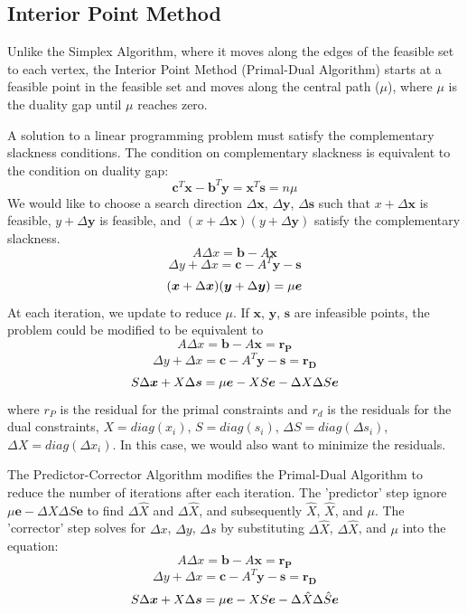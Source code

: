 \documentclass[journal, 11pt, a4paper, twoside]{IEEEtran}
\begin{document}
\subsection{Interior Point Method}
Unlike the Simplex Algorithm, where it moves along the edges of the feasible set to each vertex, the Interior Point Method (Primal-Dual Algorithm) starts at a feasible point in the feasible set and moves along the central path ($\mu$), where $\mu$ is the duality gap until $\mu$ reaches zero.

A solution to a linear programming problem must satisfy the complementary slackness conditions. The condition on complementary slackness is equivalent to the condition on duality gap:
    $$
    \bm{c}^{T}\bm{x} - \bm{b}^{T}\bm{y} =\bm{x}^{T}\bm{s} = n\mu
    $$
We would like to choose a search direction $\Delta\bm{x}$, $\Delta\bm{y}$, $\Delta\bm{s}$ such that $x + \Delta\bm{x}$ is feasible, $y + \Delta\bm{y}$ is feasible, and $(x + \Delta\bm{x})(y + \Delta\bm{y})$ satisfy the complementary slackness.
    $$
    A\Delta{x} = \bm{b} - A\bm{x} 
    $$
    $$
    \Delta{y} + \Delta{x} = \bm{c} - A^{T}\bm{y} - \bm{s}
    $$
    $$
    (\bm{x} + \Delta\bm{x})(\bm{y} + \Delta\bm{y}) = \mu\bm{e} \\
    $$
At each iteration, we update to reduce $\mu$. 
If $\bm{x}$, $\bm{y}$, $\bm{s}$ are infeasible points, the problem could be modified to be equivalent to 
    $$
    A\Delta{x} = \bm{b} - A\bm{x} = \bm{r_{P}}
    $$
    $$
    \Delta{y} + \Delta{x} = \bm{c} - A^{T}\bm{y} - \bm{s} = \bm{r_{D}}
    $$
    $$
    S\Delta\bm{x} + X\Delta\bm{s} = \mu\bm{e} - XS\bm{e} - \Delta{X}\Delta{S}\bm{e}\\
    $$
where $r_{P}$ is the residual for the primal constraints and $r_{d}$ is the residuals for the dual constraints, $X = diag({x_{i}})$, $S = diag({s_{i}})$, $\Delta{S} = diag(\Delta{s_{i}})$, $\Delta{X} = diag(\Delta{x_{i}})$. In this case, we would also want to minimize the residuals. 

The Predictor-Corrector Algorithm modifies the Primal-Dual Algorithm to reduce the number of iterations after each iteration. The 'predictor' step ignore $\mu\bm{e} - \Delta{X}\Delta{S}\bm{e}$ to find $\Delta\hat{X}$ and $\Delta\hat{X}$, and subsequently $\hat{X}$, $\hat{X}$, and $\mu$. The 'corrector' step solves for $\Delta{x}$, $\Delta{y}$, $\Delta{s}$ by substituting $\Delta\hat{X}$, $\Delta\hat{X}$, and $\mu$ into the equation:
    $$
    A\Delta{x} = \bm{b} - A\bm{x} = \bm{r_{P}}
    $$
    $$
    \Delta{y} + \Delta{x} = \bm{c} - A^{T}\bm{y} - \bm{s} = \bm{r_{D}}
    $$
    $$
    S\Delta\bm{x} + X\Delta\bm{s} = \mu\bm{e} - XS\bm{e} - \Delta\hat{X}\Delta\hat{S}\bm{e}\\
    $$
\end{document}
